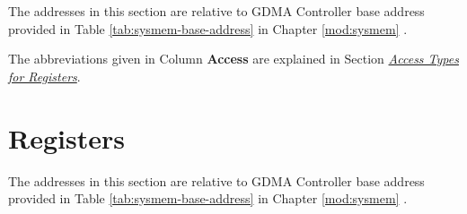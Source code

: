 \documentclass[main\_\_EN.tex]{subfiles}
\begin{document}
The addresses in this section are relative to GDMA Controller base address provided in Table \ref{tab:sysmem-base-address} in Chapter \ref{mod:sysmem} \textit{}.

The abbreviations given in Column \textbf{Access} are explained in Section \hyperref[glossary-access-types]{\textit{Access Types for Registers}}.






\clearpage
\section{Registers}

The addresses in this section are relative to GDMA Controller base address provided in Table \ref{tab:sysmem-base-address} in Chapter \ref{mod:sysmem} \textit{}.


\end{document}
